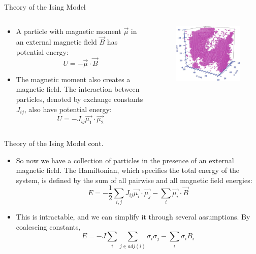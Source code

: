 \documentclass{minesbeamer}
\begin{document}
\begin{frame}{Theory of the Ising Model}
    \begin{columns}
        \begin{column}{0.6\textwidth}
            \begin{itemize}
                \item A particle with magnetic moment $\vec{\mu}$ in an external magnetic field $\vec{B}$ has potential energy: $$U = -\vec{\mu}\cdot \vec{B}$$
                \item The magnetic moment also creates a magnetic field. The interaction between particles, denoted by exchange constants $J_{ij}$, also have potential energy: $$U = -J_{ij}\vec{\mu_1}\cdot\vec{\mu_2}$$
            \end{itemize}
        \end{column}
        \begin{column}{0.4\textwidth}
            \begin{figure}
                \centering
                \includegraphics[height=0.6\textheight]{3Dising.png}
            \end{figure}
        \end{column}
    \end{columns}
\end{frame}

\begin{frame}{Theory of the Ising Model cont.}
    \centering
    \begin{itemize}
        \item So now we have a collection of particles in the presence of an external magnetic field. The Hamiltonian, which specifies the total energy of the system, is defined by the sum of all pairwise and all magnetic field energies:$$E = -\frac{1}{2}\sum_{i,j}J_{ij}\vec{\mu_i}\cdot\vec{\mu_j}-\sum_i \vec{\mu_i}\cdot\vec{B}$$
        \item This is intractable, and we can simplify it through several assumptions. By coalescing constants,$$E=-J\sum_i\sum_{j\in adj(i)}\sigma_i\sigma_j -\sum_i \sigma_i B_i$$
    \end{itemize}
\end{frame}
\end{document}
